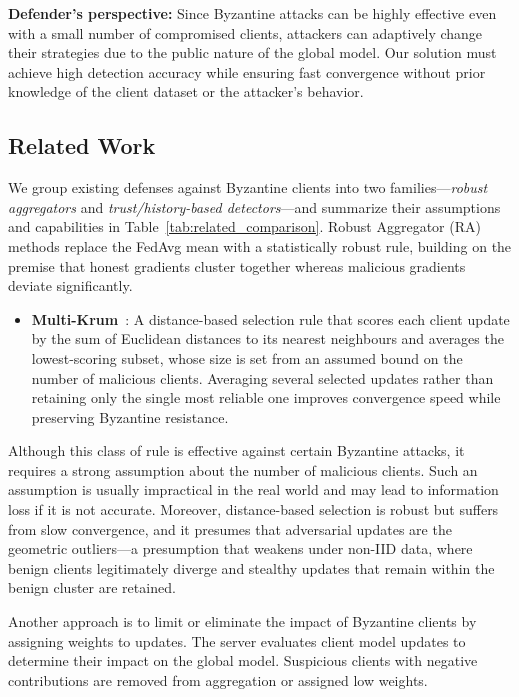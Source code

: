 \documentclass[journal]{IEEEtran}
\begin{document}
\noindent\textbf{Defender's perspective:} Since Byzantine attacks can be highly effective even with a small number of compromised clients, attackers can adaptively change their strategies due to the public nature of the global model. Our solution must achieve high detection accuracy while ensuring fast convergence without prior knowledge of the client dataset or the attacker's behavior.

\subsection{Related Work}

We group existing defenses against Byzantine clients into two families---\emph{robust aggregators} and \emph{trust/history-based detectors}---and summarize their assumptions and capabilities in Table~\ref{tab:related_comparison}. Robust Aggregator (RA) methods replace the FedAvg mean with a statistically robust rule, building on the premise that honest gradients cluster together whereas malicious gradients deviate significantly.

\begin{itemize}
    \item \textbf{Multi-Krum}~\cite{blanchard2017machine}: A distance-based selection rule that scores each client update by the sum of Euclidean distances to its nearest neighbours and averages the lowest-scoring subset, whose size is set from an assumed bound on the number of malicious clients. Averaging several selected updates rather than retaining only the single most reliable one improves convergence speed while preserving Byzantine resistance.
\end{itemize}

Although this class of rule is effective against certain Byzantine attacks, it requires a strong assumption about the number of malicious clients. Such an assumption is usually impractical in the real world and may lead to information loss if it is not accurate. Moreover, distance-based selection is robust but suffers from slow convergence, and it presumes that adversarial updates are the geometric outliers---a presumption that weakens under non-IID data, where benign clients legitimately diverge and stealthy updates that remain within the benign cluster are retained.

Another approach is to limit or eliminate the impact of Byzantine clients by assigning weights to updates. The server evaluates client model updates to determine their impact on the global model. Suspicious clients with negative contributions are removed from aggregation or assigned low weights.
\end{document}
